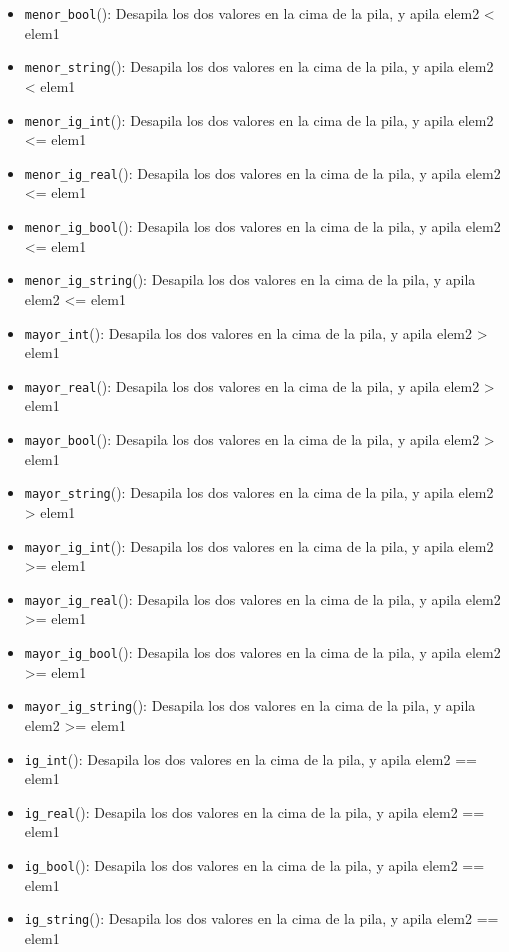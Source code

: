 \begin{itemize}
    \item \texttt{menor\_bool}(): Desapila los dos valores en la cima de la pila, y apila elem2 < \; elem1
    \item \texttt{menor\_string}(): Desapila los dos valores en la cima de la pila, y apila elem2 < \; elem1
    \item \texttt{menor\_ig\_int}(): Desapila los dos valores en la cima de la pila, y apila elem2 <= \; elem1
    \item \texttt{menor\_ig\_real}(): Desapila los dos valores en la cima de la pila, y apila elem2 <= \; elem1
    \item \texttt{menor\_ig\_bool}(): Desapila los dos valores en la cima de la pila, y apila elem2 <= \; elem1
    \item \texttt{menor\_ig\_string}(): Desapila los dos valores en la cima de la pila, y apila elem2 <= \; elem1
    \item \texttt{mayor\_int}(): Desapila los dos valores en la cima de la pila, y apila elem2 > \; elem1
    \item \texttt{mayor\_real}(): Desapila los dos valores en la cima de la pila, y apila elem2 > \; elem1
    \item \texttt{mayor\_bool}(): Desapila los dos valores en la cima de la pila, y apila elem2 > \; elem1
    \item \texttt{mayor\_string}(): Desapila los dos valores en la cima de la pila, y apila elem2 > \; elem1
    \item \texttt{mayor\_ig\_int}(): Desapila los dos valores en la cima de la pila, y apila elem2 >= \; elem1
    \item \texttt{mayor\_ig\_real}(): Desapila los dos valores en la cima de la pila, y apila elem2 >= \; elem1
    \item \texttt{mayor\_ig\_bool}(): Desapila los dos valores en la cima de la pila, y apila elem2 >= \; elem1
    \item \texttt{mayor\_ig\_string}(): Desapila los dos valores en la cima de la pila, y apila elem2 >= \; elem1
    \item \texttt{ig\_int}(): Desapila los dos valores en la cima de la pila, y apila elem2 == elem1
    \item \texttt{ig\_real}(): Desapila los dos valores en la cima de la pila, y apila elem2 == elem1
    \item \texttt{ig\_bool}(): Desapila los dos valores en la cima de la pila, y apila elem2 == elem1
    \item \texttt{ig\_string}(): Desapila los dos valores en la cima de la pila, y apila elem2 == elem1

\end{itemize}

